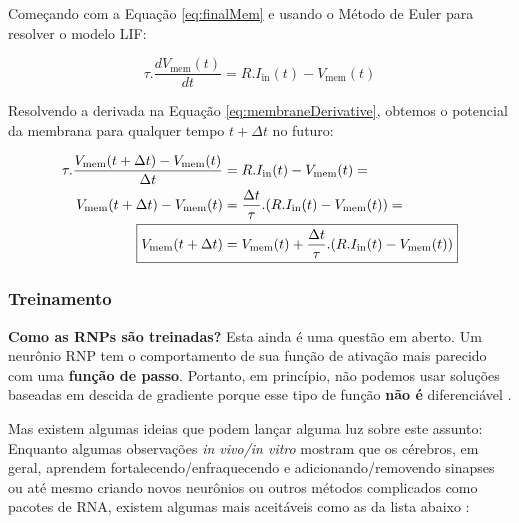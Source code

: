 			\par Começando com a Equação \autoref{eq:finalMem} e usando o Método de Euler para resolver o modelo LIF:
			
			\begin{equation}
				\tau.\dfrac{dV_{\text{mem}}(t)}{dt} = R.I_{\text{in}}(t) - V_{\text{mem}}(t)
			\end{equation}
			
			\par Resolvendo a derivada na Equação \autoref{eq:membraneDerivative}, obtemos o potencial da membrana para qualquer tempo $t+\Delta t$ no futuro:
			
			\begin{equation}
				\label{eq:membraneDerivative}
				\begin{aligned}
					\tau.\dfrac{V_{\text{mem}}(t+\Delta t) - V_{\text{mem}}(t)}{\Delta t} &= R.I_{\text{in}}(t) - V_{\text{mem}}(t) = \\
					V_{\text{mem}}(t+\Delta t) - V_{\text{mem}}(t) &= \frac{\Delta t}{\tau} . (R.I_{\text{in}}(t) - V_{\text{mem}}(t)) = \\
					\Aboxed{V_{\text{mem}}(t+\Delta t) &= V_{\text{mem}}(t) + \frac{\Delta t}{\tau} . (R.I_{\text{in}}(t) - V_{\text{mem}}(t))}
				\end{aligned}
			\end{equation}

		\subsubsection{Treinamento}
		
			\par \textbf{Como as RNPs são treinadas?} Esta ainda é uma questão em aberto. Um neurônio RNP tem o comportamento de sua função de ativação mais parecido com uma \textbf{função de passo}. Portanto, em princípio, não podemos usar soluções baseadas em descida de gradiente porque esse tipo de função \textbf{não é} diferenciável \cite{kasabov2019time}.
			
			\par Mas existem algumas ideias que podem lançar alguma luz sobre este assunto: Enquanto algumas observações \textit{in vivo/in vitro} mostram que os cérebros, em geral, aprendem fortalecendo/enfraquecendo e adicionando/removendo sinapses ou até mesmo criando novos neurônios ou outros métodos complicados como pacotes de RNA, existem algumas mais aceitáveis como as da lista abaixo \cite{kasabov2019time}:
			
